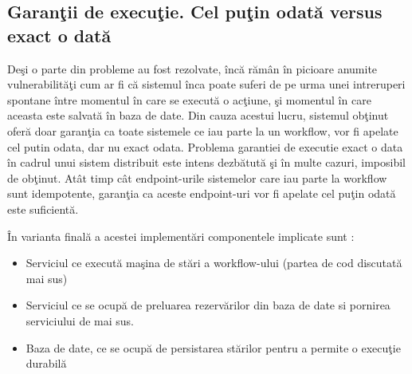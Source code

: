 \subsection{Garanţii de execuţie. Cel puţin odată versus exact o dată}
\par Deşi o parte din probleme au fost rezolvate, încă rămân în picioare anumite vulnerabilităţi cum ar fi că sistemul înca poate suferi de pe urma unei intreruperi spontane între momentul în care se execută o acţiune, şi momentul în care aceasta este salvată în baza de date. Din cauza acestui lucru, sistemul obţinut oferă doar garanţia ca toate sistemele ce iau parte la un workflow, vor fi apelate cel putin odata, dar nu exact odata. Problema garantiei de executie exact o data în cadrul unui sistem distribuit este intens dezbătută şi în multe cazuri, imposibil de obţinut. Atât timp cât endpoint-urile sistemelor care iau parte la workflow sunt idempotente, garanţia ca aceste endpoint-uri vor fi apelate cel puţin odată este suficientă.
\par În varianta finală a acestei implementări componentele implicate sunt : 
\begin{itemize}
\item Serviciul ce execută maşina de stări a workflow-ului (partea de cod discutată mai sus)
\item Serviciul ce se ocupă de preluarea rezervărilor din baza de date si pornirea serviciului de mai sus.
\item Baza de date, ce se ocupă de persistarea stărilor pentru a permite o execuţie durabilă
\end{itemize}
